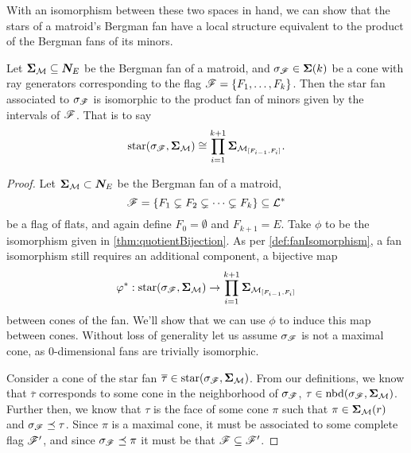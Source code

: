 \documentclass[12pt,oneside]{../../sfsuthesis}
\begin{document}
With an isomorphism between these two spaces in hand, we can show that the stars of a matroid's Bergman fan have a local structure equivalent to the product of the Bergman fans of its minors.
\begin{lemma}\th\label{thm:starBijection}
    Let \( {\bm{\Sigma}}_{\mathcal{M}} \subseteq \bm{N}_E \) be the Bergman fan of a matroid,
    and \( \sigma_{\mathscr{F}} \in {\bm{\Sigma}}(k) \) be a cone with ray generators corresponding to the flag \( \mathscr{F} = \{F_1, \dots, F_k\} \).
    Then the star fan associated to \( \sigma_{\mathscr{F}} \) is isomorphic to the product fan of minors given by the intervals of \( \mathscr{F} \).
    That is to say
    \[
        \operatorname{star}(\sigma_{\mathscr{F}}, {\bm{\Sigma}}_{\mathcal{M}}) \cong \prod_{i=1}^{k+1} {\bm{\Sigma}}_{\mathcal{M}_{[F_{i-1}, F_i]}}.
    \]
\end{lemma}
\begin{proof}
    Let \( {\bm{\Sigma}}_{\mathcal{M}} \subset \bm{N}_E \) be the Bergman fan of a matroid,
    \[
        \mathscr{F} = \{ F_1 \subsetneq F_2 \subsetneq \cdots \subsetneq F_k \} \subseteq \mathcal{L}^\ast
    \]
    be a flag of flats, and again define \( F_0 = \emptyset \) and \( F_{k+1} = E \).
    Take \( \phi \) to be the isomorphism given in \th\ref{thm:quotientBijection}.
    As per \th\ref{def:fanIsomorphism}, a fan isomorphism still requires an additional component, a bijective map
    \[
        \varphi^\ast: \operatorname{star}(\sigma_{\mathscr{F}}, {\bm{\Sigma}}_{\mathcal{M}}) \to \prod_{i=1}^{k+1} {\bm{\Sigma}}_{\mathcal{M}_{[F_{i-1}, F_i]}}
    \]
    between cones of the fan.
    We'll show that we can use \( \phi \) to induce this map between cones.
    Without loss of generality let us assume \( \sigma_{\mathscr{F}} \) is not a maximal cone, as 0-dimensional fans are trivially isomorphic.

    Consider a cone of the star fan \( \overline{\tau} \in \operatorname{star}(\sigma_{\mathscr{F}}, {\bm{\Sigma}}_{\mathcal{M}}) \).
    From our definitions, we know that \( \overline{\tau} \) corresponds to some cone in the neighborhood of \( \sigma_{\mathscr{F}} \), \( \tau \in \operatorname{nbd}(\sigma_{\mathscr{F}}, {\bm{\Sigma}}_{\mathcal{M}}) \).
    Further then, we know that \( \tau \) is the face of some cone \( \pi \) such that \( \pi \in {\bm{\Sigma}}_{\mathcal{M}}(r) \) and \( \sigma_{\mathscr{F}} \preceq \tau \).
    Since \( \pi \) is a maximal cone, it must be associated to some complete flag \( \mathscr{F}' \), and since \( \sigma_{\mathscr{F}} \preceq \pi \) it must be that \( \mathscr{F} \subseteq \mathscr{F}' \).


\end{proof}
\end{document}
